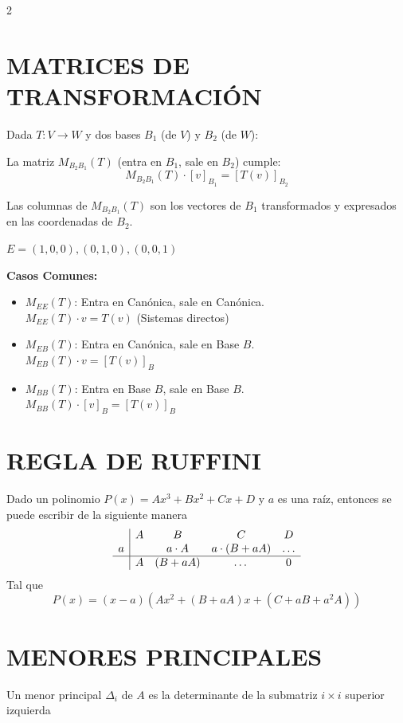 \documentclass[10pt]{extarticle}
\newenvironment{term}
  {\begin{minipage}{\linewidth}}
  {\end{minipage}\par}
\begin{document}
\begin{multicols}{2}
\begin{term}
\section*{MATRICES DE TRANSFORMACIÓN}
Dada $T: V \to W$ y dos bases $B_1$ (de $V$) y $B_2$ (de $W$):

La matriz $M_{B_2B_1}(T)$ (entra en $B_1$, sale en $B_2$) cumple:
$$M_{B_2B_1}(T)\cdot[v]_{B_1} = [T(v)]_{B_2}$$

Las columnas de $M_{B_2B_1}(T)$ son los vectores de $B_1$ transformados y expresados en las coordenadas de $B_2$.

$E=(1,0,0),(0,1,0),(0,0,1)$

\textbf{Casos Comunes:}
\begin{itemize}[leftmargin=1.2em]
\item $M_{EE}(T)$: Entra en Canónica, sale en Canónica. \\ $M_{EE}(T)\cdot v = T(v)$ (Sistemas directos)
\item $M_{EB}(T)$: Entra en Canónica, sale en Base $B$. \\ $M_{EB}(T)\cdot v = [T(v)]_B$
\item $M_{BB}(T)$: Entra en Base $B$, sale en Base $B$. \\ $M_{BB}(T)\cdot[v]_B = [T(v)]_B$
\end{itemize}
\end{term}

\begin{term}
\section*{REGLA DE RUFFINI}
Dado un polinomio $P(x)=Ax^3+Bx^2+Cx+D$ y $a$ es una raíz, entonces se puede escribir de la siguiente manera
$$\begin{array}{r|cccc}
    & A & B & C & D \\
  a &   & a \cdot A & a \cdot (B + aA) & \dots \\
\hline
    & A & (B + aA) & \dots & 0
\end{array}$$
Tal que $$P(x)=(x-a)(Ax^2+(B+aA)x+(C+aB+a^2A))$$
\end{term}

\begin{term}
\section*{MENORES PRINCIPALES}
Un menor principal $\Delta_i$ de $A$ es la determinante de la submatriz $i\times i$ superior izquierda
\end{term}


\end{multicols}
\end{document}
